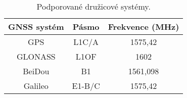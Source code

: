 \begin{table}[h!]
\centering
\begin{tabular}{c|c c }

GNSS systém & Pásmo & Frekvence (MHz) \\ 
\hline 
\hline
GPS & L1C/A & 1575,42 \\ 

GLONASS & L1OF & 1602 \\ 

BeiDou & B1 & 1561,098 \\ 

Galileo & E1-B/C & 1575,42 \\ 

\end{tabular} 
\caption{Podporované družicové systémy. \cite{DLQg9bT6V1GWKhxh} }
\label{table:gnssBands}
\end{table} 
